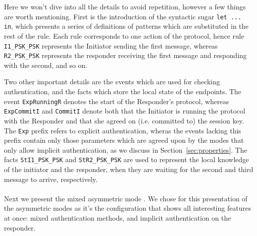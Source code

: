 Here we won't dive into all the details to avoid repetition, however a
few things are worth mentioning.  First is the introduction of the
syntactic sugar \lstinline{let ... in}, which presents a series of
definitions of patterns which are substituted in the rest of the
rule. Each rule corresponds to one action of the protocol, hence rule
\lstinline{I1_PSK_PSK} represents the Initiator sending the first
message, whereas \lstinline{R2_PSK_PSK} represents the responder
receiving the first message and responding with the second, and so on. 

Two other important details are the events which are used for checking
authentication, and the facts which store the local state of the
endpoints. 
%
The event \lstinline{ExpRunningR} denotes the start of the Responder's
protocol, whereas \lstinline{ExpCommitI} and \lstinline{CommitI}
denote both that the Initiator is running the protocol with the
Responder and that she agreed on (i.e. committed to) the session key.
%
The \lstinline{Exp} prefix refers to explicit authentication, wheras
the events lacking this prefix contain only those parameters which are
agreed upon by the modes that only allow implicit authentication, as
we discuss in Section~\ref{sec:properties}.
%
The facts \lstinline{StI1_PSK_PSK} and \lstinline{StR2_PSK_PSK} are
used to represent the local knowledge of the initiator and the
responder, when they are waiting for the second and third message to
arrive, respectively.


\paragraph{\mStatSig{}}
Next we present the mixed asymmetric mode \mStatSig. We chose \mStatSig{}
for this presentation of the asymmetric modes as it's the
configuration that shows all interesting features at once: mixed
authentication methods, and implicit authentication on the responder.

